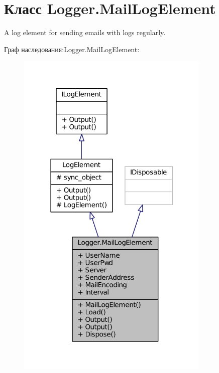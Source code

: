 \hypertarget{class_logger_1_1_mail_log_element}{}\section{Класс Logger.\+Mail\+Log\+Element}
\label{class_logger_1_1_mail_log_element}


A log element for sending emails with logs regularly.  




Граф наследования\+:Logger.\+Mail\+Log\+Element\+:
\nopagebreak
\begin{figure}[H]
\begin{center}
\leavevmode
\includegraphics[width=261pt]{class_logger_1_1_mail_log_element__inherit__graph}
\end{center}
\end{figure}


